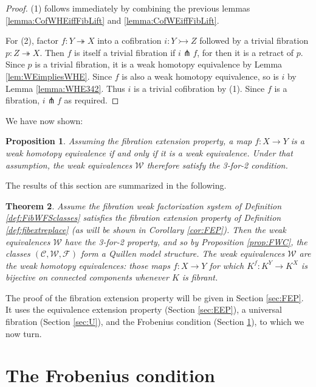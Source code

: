 \documentclass[11pt,reqno]{amsart}
\newcommand{\CC}{\ensuremath{\mathcal{C}}}
\newcommand{\WW}{\ensuremath{\mathcal{W}}}
\newcommand{\FF}{\ensuremath{\mathcal{F}}}
\newcommand{\mono}{\ensuremath{\rightarrowtail}}
\newcommand{\ra}{\ensuremath{\rightarrow}}
\renewcommand{\to}{\ensuremath{\rightarrow}}
\newcommand{\onto}{\ensuremath{\twoheadrightarrow}}
\newtheorem{theorem}{Theorem}
\newtheorem{proposition}[theorem]{Proposition}
\theoremstyle{remark}
\theoremstyle{definition}
\begin{document}
\begin{proof}
(1) follows immediately by combining the previous lemmas \ref{lemma:CofWHEiffFibLift} and \ref{lemma:CofWEiffFibLift}.

For (2), factor $ f : Y \onto X$ into a cofibration $i : Y\mono Z$ followed by a trivial fibration $p: Z\onto X$.  Then $f$ is itself a trivial fibration if $i\pitchfork f$, for then it is a retract of $p$.  Since $p$ is a trivial fibration, it is a weak homotopy equivalence by Lemma \ref{lem:WEimpliesWHE}.  Since $f$ is also a weak homotopy equivalence, so is $i$ by Lemma \ref{lemma:WHE342}.  Thus $i$ is a trivial cofibration by (1). Since $f$ is a fibration, $i\pitchfork f$ as required.
\end{proof}

We have now shown:

\begin{proposition}\label{prop:WHEiffWE}
Assuming the fibration extension property, a map $ f : X \to Y$ is a weak homotopy equivalence if and only if it is a weak equivalence.   Under that assumption, the weak equivalences $\mathcal{W}$ therefore satisfy the 3-for-2 condition.
\end{proposition}

The results of this section are summarized in the following.

\begin{theorem}\label{theorem:QMSmodFEP}
Assume the fibration weak factorization system of Definition \ref{def:FibWFSclasses} satisfies the fibration extension property of Definition \ref{def:fibextreplace} (as will be shown  in Corollary \ref{cor:FEP}). 
Then the weak equivalences $\WW$ have the 3-for-2 property, and so by Proposition \ref{prop:FWC}, the classes $(\CC,\WW,\FF)$ form a Quillen model structure.
The weak equivalences $\WW$  are the \emph{weak homotopy equivalences}: those maps $f: X\ra Y$ for which $K^f : K^Y \to K^X$ is bijective on connected components whenever $K$ is fibrant.
\end{theorem}

The proof of the fibration extension property will be given in Section \ref{sec:FEP}.  It uses the equivalence extension property (Section \ref{sec:EEP}), a universal fibration (Section \ref{sec:U}), and the Frobenius condition (Section \ref{sec:Frobenius}), to which we now turn.

\section{The Frobenius condition}\label{sec:Frobenius}
\end{document}
